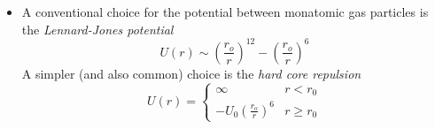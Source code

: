 \documentclass[11pt, a4paper]{article}
\begin{document}
\begin{itemize}
	\item A conventional choice for the potential between monatomic gas particles is the \textit{Lennard-Jones potential}
	\begin{equation*}
		U(r) \sim \left(\frac{r_{o}}{r}\right)^{12} - \left(\frac{r_{o}}{r}\right)^{6}
	\end{equation*}
	A simpler (and also common) choice is the \textit{hard core repulsion}
	\begin{equation*}
		U(r) = 
		\begin{cases}
			\infty & r < r_{0}\\
			-U_{0}\left(\frac{r_{o}}{r}\right)^{6} & r \geq r_{0}
		\end{cases}
	\end{equation*}
\end{itemize}
\end{document}
